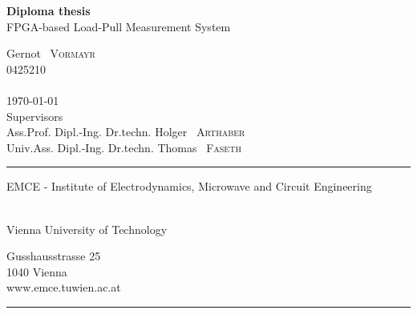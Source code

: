 \documentclass[12pt,a4paper,parskip=full,abstract=true,BCOR=12mm,twoside,open=right]{scrreprt}
\begin{document}
\begin{titlepage}
    \enlargethispage{1cm}
    \centering
    \vspace*{5cm}
    {\Huge \textbf{Diploma thesis}}\\
    \vspace*{1cm}
    {\Large FPGA-based Load-Pull Measurement System}

    \vspace*{2cm}
    {\large Gernot ~\textsc{Vormayr} \\ 0425210 \\ } ~\\

    \vspace*{2cm}
    {\today } ~\\

    \vfill
    {Supervisors} ~\\\vspace*{0.1cm}
    {Ass.Prof. Dipl.-Ing. Dr.techn. \large Holger ~\textsc{Arthaber}} ~\\
    {Univ.Ass. Dipl.-Ing. Dr.techn. \large Thomas ~\textsc{Faseth}}
    \vspace*{2cm}

    \rule{\linewidth}{0.4pt}
    \begin{minipage}[t]{0.55\linewidth}
        \flushleft
        \begin{large}
            EMCE - Institute of Electrodynamics, Microwave and Circuit Engineering
        \end{large}\\
        Vienna University of Technology
    \end{minipage}
    \hfill
    \begin{minipage}[t]{0.27\linewidth}
        \flushright
        Gusshausstrasse 25\\
        1040 Vienna\\
        www.emce.tuwien.ac.at
    \end{minipage}
    \vspace*{-3pt}
    \rule{\linewidth}{0.4pt}
    \clearpage
\end{titlepage}

\begin{abstract}
    \begin{itemize}
        \item RFPA
        \item load-pull
        \item the one in this work
        \item verification
    \end{itemize}
\end{abstract}
\end{document}
